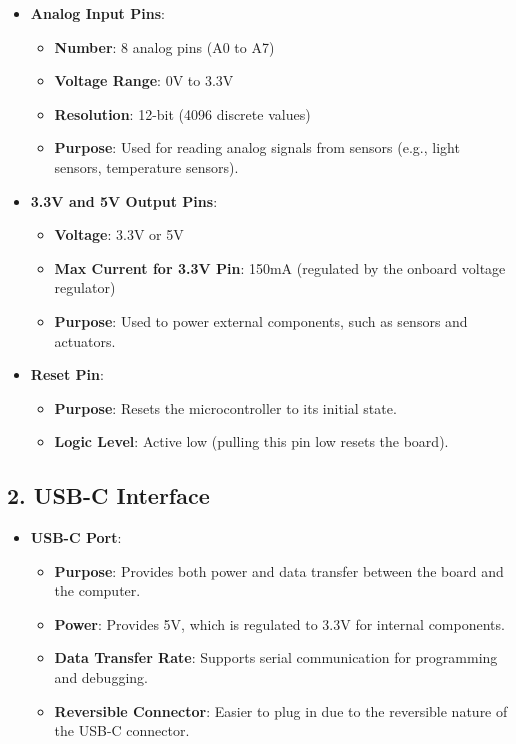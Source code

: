 \begin{itemize}
		\item \textbf{Analog Input Pins}:
		\begin{itemize}
			\item \textbf{Number}: 8 analog pins (A0 to A7)
			\item \textbf{Voltage Range}: 0V to 3.3V
			\item \textbf{Resolution}: 12-bit (4096 discrete values)
			\item \textbf{Purpose}: Used for reading analog signals from sensors (e.g., light sensors, temperature sensors).
		\end{itemize}
		
		\item \textbf{3.3V and 5V Output Pins}:
		\begin{itemize}
			\item \textbf{Voltage}: 3.3V or 5V
			\item \textbf{Max Current for 3.3V Pin}: 150mA (regulated by the onboard voltage regulator)
			\item \textbf{Purpose}: Used to power external components, such as sensors and actuators.
		\end{itemize}
		
		\item \textbf{Reset Pin}:
		\begin{itemize}
			\item \textbf{Purpose}: Resets the microcontroller to its initial state.
			\item \textbf{Logic Level}: Active low (pulling this pin low resets the board).
		\end{itemize}
	\end{itemize}
	
	\subsection*{2. USB-C Interface}
	
	\begin{itemize}
		\item \textbf{USB-C Port}:
		\begin{itemize}
			\item \textbf{Purpose}: Provides both power and data transfer between the board and the computer.
			\item \textbf{Power}: Provides 5V, which is regulated to 3.3V for internal components.
			\item \textbf{Data Transfer Rate}: Supports serial communication for programming and debugging.
			\item \textbf{Reversible Connector}: Easier to plug in due to the reversible nature of the USB-C connector.
		\end{itemize}
	\end{itemize}
	
